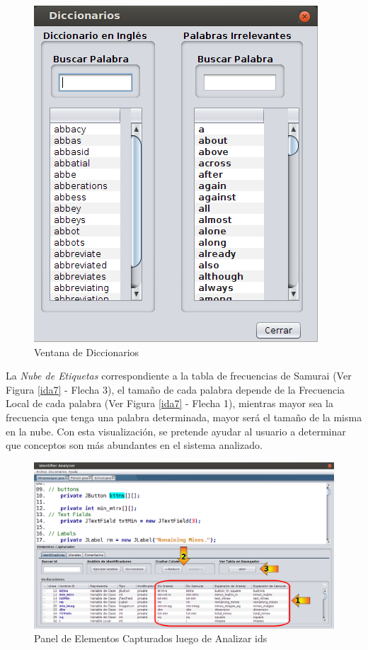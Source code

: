 \begin{figure}[t] %
\centerline{%
\includegraphics[scale= 0.58]{./cap4/ida_09.png}
}
\caption{Ventana de Diccionarios}
\label{ida9}
\end{figure}

La \textit{Nube de Etiquetas} correspondiente a la tabla de frecuencias de Samurai (Ver Figura \ref{ida7} - Flecha 3), el tamaño de cada palabra depende de la Frecuencia Local de cada palabra (Ver Figura \ref{ida7} - Flecha 1), mientras mayor sea la frecuencia que tenga una palabra determinada, mayor será el tamaño de la misma en la nube. Con esta visualización, se pretende ayudar al usuario a determinar que conceptos son más abundantes en el sistema analizado.


\pagebreak

\begin{figure}[t] %
\centerline{%
\includegraphics[scale= 0.42]{./cap4/ida_10.png}
}
\caption{Panel de Elementos Capturados luego de Analizar ids}
\label{ida10}
\end{figure}

